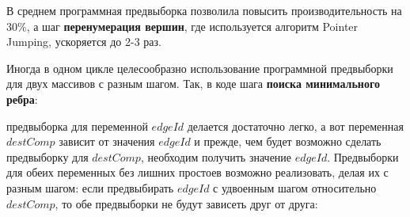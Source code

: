 \documentclass[a4paper,12pt]{extarticle}
\begin{document}
В среднем программная предвыборка позволила повысить производительность на 30\%, а шаг \textbf{перенумерация вершин}, где используется алгоритм Pointer Jumping, ускоряется до 2-3 раз. 

Иногда в одном цикле целесообразно использование программной предвыборки для двух массивов с разным шагом. Так, в коде шага \textbf{поиска минимального ребра}:

\begin{algorithm}[H]
    \SetAlgoLined
\end{algorithm}
предвыборка для переменной $edgeId$ делается достаточно легко, а вот переменная $destComp$ зависит от значения $edgeId$ и прежде, чем будет возможно сделать предвыборку для $destComp$, необходим получить значение $edgeId$.
Предвыборки для обеих переменных без лишних простоев возможно реализовать, делая их с разным шагом: если предвыбирать $edgeId$ с удвоенным шагом относительно $destComp$, то обе предвыборки не будут зависеть друг от друга:



\begin{algorithm}[H]
    \SetAlgoLined
\end{algorithm}
\end{document}
